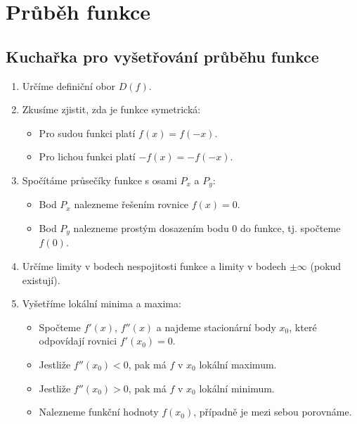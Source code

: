\section{Průběh funkce}



\subsection{Kuchařka pro vyšetřování průběhu funkce}

\begin{enumerate}

    \item Určíme definiční obor $D(f)$.
    
    \item Zkusíme zjistit, zda je funkce symetrická:
    \begin{itemize}
        \item Pro sudou funkci platí $f(x) = f(-x)$.
        \item Pro lichou funkci platí $-f(x) = - f(-x)$.
    \end{itemize}

    \item Spočítáme průsečíky funkce s osami $P_x$ a $P_y$:
    \begin{itemize}
        \item Bod $P_x$ nalezneme řešením rovnice
        $f(x)=0$.
        \item Bod $P_y$ nalezneme prostým dosazením bodu $0$ do funkce, tj. spočteme $f(0)$.
    \end{itemize}
     
    \item Určíme limity v bodech nespojitosti funkce a limity v bodech $\pm \infty$ (pokud existují).

    \item Vyšetříme lokální minima a maxima:
    \begin{itemize}
        \item Spočteme $f'(x)$, $f''(x)$ a najdeme stacionární body $x_0$, které odpovídají rovnici $f'(x_0) = 0$.
        \item Jestliže $f''(x_0) < 0$, pak má $f$ v $x_0$ lokální maximum.
        \item Jestliže $f''(x_0) > 0$, pak má $f$ v $x_0$ lokální minimum.
        \item Nalezneme funkční hodnoty $f(x_0)$, případně je mezi sebou porovnáme.
    \end{itemize}
    

\end{enumerate}
